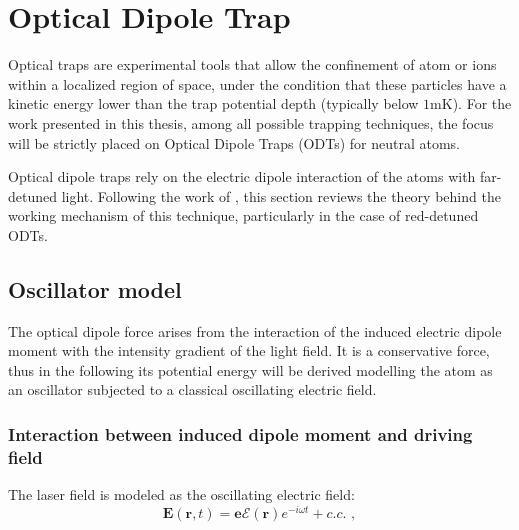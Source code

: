 \section{Optical Dipole Trap}\label{sec:ODT_theory}
Optical traps are experimental tools that allow the confinement of atom or ions within a localized region of space, under the condition that these particles have a kinetic energy lower than the trap potential depth (typically below $1$mK). For the work presented in this thesis, among all possible trapping techniques, the focus will be strictly placed on Optical Dipole Traps (ODTs) for neutral atoms.

Optical dipole traps rely on the electric dipole interaction of the atoms with far-detuned light. Following the work of \citeauthor*{grimm} \cite{grimm}, this section reviews the theory behind the working mechanism of this technique, particularly in the case of red-detuned ODTs. 

\subsection{Oscillator model}
The optical dipole force arises from the interaction of the induced electric dipole moment with the intensity gradient of the light field. It is a conservative force, thus in the following its potential energy will be derived modelling the atom as an oscillator subjected to a classical oscillating electric field.

\subsubsection{Interaction between induced dipole moment and driving field}


The laser field is modeled as the oscillating electric field: 
\begin{equation}
    \mathbf{E}(\mathbf{r},t) = \hat{\mathbf{e}} \mathcal{E}(\mathbf{r}) e^{-i\omega t} + c.c. \,\, ,
\end{equation}

